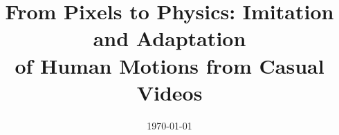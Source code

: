 \documentclass[MTech]{iittpdiss}
\begin{document}

\title{From Pixels to Physics: Imitation and Adaptation \\of Human Motions from Casual Videos}


\date{\today}

\maketitle







\end{document}
